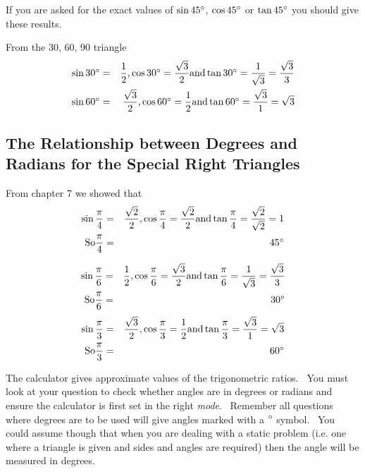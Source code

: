 If you are asked for the exact values of $\sin  45 \mbox{{\ensuremath{{}^\circ}}}$, $\cos  45 \mbox{{\ensuremath{{}^\circ}}}$ or $\tan  45 \mbox{{\ensuremath{{}^\circ}}}$ you should give these results. 

From the 30, 60, 90 triangle
\begin{align*}\sin  30 \mbox{{\ensuremath{{}^\circ}}} &  = & \frac{1}{2}\text{,}\cos  30 \mbox{{\ensuremath{{}^\circ}}} =\frac{\sqrt{3}}{2}\text{and}\tan  30 \mbox{{\ensuremath{{}^\circ}}} =\frac{1}{\sqrt{3}} =\frac{\sqrt{3}}{3} \\
\sin  60 \mbox{{\ensuremath{{}^\circ}}} &  = & \frac{\sqrt{3}}{2}\text{,}\cos  60 \mbox{{\ensuremath{{}^\circ}}} =\frac{1}{2}\text{and}\tan  60 \mbox{{\ensuremath{{}^\circ}}} =\frac{\sqrt{3}}{1} =\sqrt{3}\end{align*}

\subsection{The Relationship between Degrees and Radians for the Special Right Triangles}
From chapter 7 we showed that
\begin{align*}\sin  \frac{\pi }{4} &  = & \frac{\sqrt{2}}{2}\text{,}\cos  \frac{\pi }{4} =\frac{\sqrt{2}}{2}\text{and}\tan  \frac{\pi }{4} =\frac{\sqrt{2}}{\sqrt{2}} =1 \\
\text{So}\frac{\pi }{4} &  = & 45 \mbox{{\ensuremath{{}^\circ}}}\end{align*}


\begin{align*}\sin  \frac{\pi }{6} &  = & \frac{1}{2}\text{,}\cos  \frac{\pi }{6} =\frac{\sqrt{3}}{2}\text{and}\tan  \frac{\pi }{6} =\frac{1}{\sqrt{3}} =\frac{\sqrt{3}}{3} \\
\text{So}\frac{\pi }{6} &  = & 30 \mbox{{\ensuremath{{}^\circ}}}\end{align*}
\begin{align*}\sin  \frac{\pi }{3} &  = & \frac{\sqrt{3}}{2}\text{,}\cos  \frac{\pi }{3} =\frac{1}{2}\text{and}\tan  \frac{\pi }{3} =\frac{\sqrt{3}}{1} =\sqrt{3} \\
\text{So}\frac{\pi }{3} &  = & 60 \mbox{{\ensuremath{{}^\circ}}}\end{align*}

The calculator gives approximate values of the trigonometric ratios. \ You
must look at your question to check whether angles are in degrees or radians and ensure the calculator is first set in the right \emph{mode}.
\ Remember all questions where degrees are to be used will give angles marked with a $\mbox{{\ensuremath{{}^\circ}}}$ symbol. \ You could assume though that when you
are dealing with a static problem (i.e. one where a triangle is given and sides and angles are required) then the angle will be measured in degrees. 

